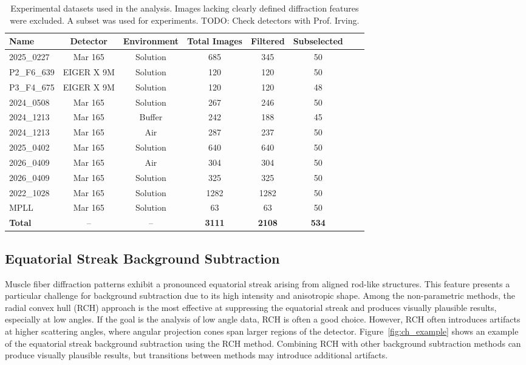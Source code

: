 \documentclass[iucr]{iucrjournals}
\begin{document}
\begin{table}[t]
\caption{Experimental datasets used in the analysis. Images lacking clearly defined diffraction features were excluded. A subset was used for experiments. {\color{red} TODO: Check detectors with Prof. Irving.}}
\label{tab:datasets}
\centering
\small
\setlength{\tabcolsep}{4pt}
\renewcommand{\arraystretch}{1.0}
\begin{tabular}{@{}lccccccc@{}}
\toprule
\textbf{Name} & \textbf{Detector} & \textbf{Environment} & \textbf{Total Images} & \textbf{Filtered} & \textbf{Subselected} \\ \midrule
2025\_0227 & Mar 165 & Solution & 685 & 345 & 50 \\
P2\_F6\_639 & EIGER X 9M & Solution & 120 & 120 & 50 \\
P3\_F4\_675 & EIGER X 9M & Solution & 120 & 120 & 48 \\
2024\_0508 & Mar 165 & Solution & 267 & 246 & 50 \\
2024\_1213 & Mar 165 & Buffer & 242 & 188 & 45 \\
2024\_1213 & Mar 165 & Air & 287 & 237 & 50 \\
2025\_0402 & Mar 165 & Solution & 640 & 640 & 50 \\
2026\_0409 & Mar 165 & Air & 304 & 304 & 50 \\
2026\_0409 & Mar 165 & Solution & 325 & 325 & 50 \\
2022\_1028 & Mar 165 & Solution & 1282 & 1282 & 50 \\
MPLL & Mar 165 & Solution & 63 & 63 & 50 \\ \midrule
\textbf{Total} & -- & -- & \textbf{3111} & \textbf{2108} & \textbf{534} \\
\bottomrule
\end{tabular}
\end{table}


\subsection{Equatorial Streak Background Subtraction}


Muscle fiber diffraction patterns exhibit a pronounced equatorial streak arising from aligned rod-like structures. This feature presents a particular challenge for background subtraction due to its high intensity and anisotropic shape. Among the non-parametric methods, the radial convex hull (RCH) approach is the most effective at suppressing the equatorial streak and produces visually plausible results, especially at low angles. If the goal is the analysis of low angle data, RCH is often a good choice. However, RCH often introduces artifacts at higher scattering angles, where angular projection cones span larger regions of the detector. Figure~\ref{fig:ch_example} shows an example of the equatorial streak background subtraction using the RCH method. Combining RCH with other background subtraction methods can produce visually plausible results, but transitions between methods may introduce additional artifacts. 
\end{document}
